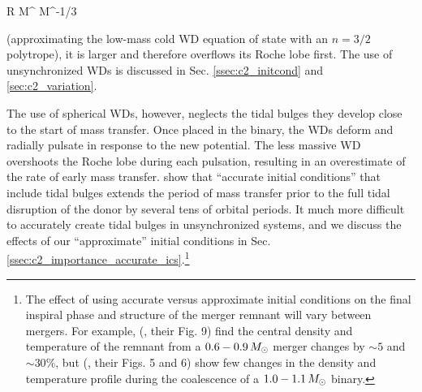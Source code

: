 \eqbegin
R \propto M^{} \approx M^{-1/3}
\label{eq:c1_massradiusrelation}
\eqend

\noindent (approximating the low-mass cold WD equation of state with an $n = 3/2$ polytrope), it is larger and therefore overflows its Roche lobe first.  The use of unsynchronized WDs is discussed in Sec. \ref{ssec:c2_initcond} and \ref{sec:c2_variation}.  


The use of spherical WDs, however, neglects the tidal bulges they develop close to the start of mass transfer.  Once placed in the binary, the WDs deform and radially pulsate in response to the new potential.  The less massive WD overshoots the Roche lobe during each pulsation, resulting in an overestimate of the rate of early mass transfer.  \cite{dan+11} show that ``accurate initial conditions'' that include tidal bulges extends the period of mass transfer prior to the full tidal disruption of the donor by several tens of orbital periods.  It much more difficult to accurately create tidal bulges in unsynchronized systems, and we discuss the effects of our ``approximate'' initial conditions in Sec. \ref{ssec:c2_importance_accurate_ics}.\footnote{The effect of using accurate versus approximate initial conditions on the final inspiral phase and structure of the merger remnant will vary between mergers.  For example, \citeauthor{dan+11} (\citeyear{dan+11}, their Fig. 9) find the central density and temperature of the remnant from a $0.6-0.9\,\Msun$ merger changes by $\sim5$ and $\sim30$\%, but \citeauthor{pakm+12sph} (\citeyear{pakm+12sph}, their Figs. 5 and 6) show few changes in the density and temperature profile during the coalescence of a $1.0 - 1.1\,\Msun$ binary.}



